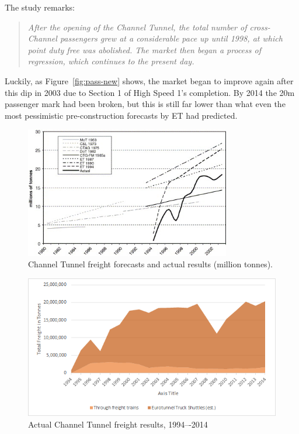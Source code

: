 \documentclass[12pt]{article} %
\begin{document}
The study remarks:
\begin{quote}
\textit{After the opening of the Channel Tunnel, the total number of cross-Channel passengers grew at a considerable pace up until 1998, at which point duty free was abolished. The market then began a process of regression, which continues to the present day.}
\end{quote}

Luckily, as Figure~\ref{fig:pass-new} shows, the market began to improve again after this dip in 2003 due to Section 1 of High Speed 1's completion. By 2014 the 20m passenger mark had been broken, but this is still far lower than what even the most pessimistic pre-construction forecasts by ET had predicted.

\begin{figure}[hp]
  \centering
  \includegraphics[width=0.8\textwidth]{freight}
  \caption{Channel Tunnel freight forecasts and actual results (million tonnes).}
  \label{fig:freight-fore}
\end{figure}

\begin{figure}[hp]
  \centering
  \includegraphics[width=\textwidth]{freight-new}
  \caption{Actual Channel Tunnel freight results, 1994–-2014}
  \label{fig:freight-new}
\end{figure}
\end{document}
